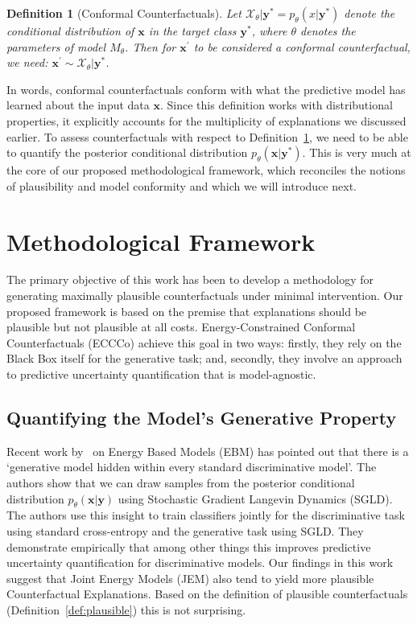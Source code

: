 \documentclass{article}
\newtheorem{definition}{Definition}[section]
\begin{document}
\begin{definition}[Conformal Counterfactuals]
  \label{def:conformal}
  Let $\mathcal{X}_{\theta}|\mathbf{y}^* = p_{\theta}(x|\mathbf{y}^*)$ denote the conditional distribution of $\mathbf{x}$ in the target class $\mathbf{y}^*$, where $\theta$ denotes the parameters of model $M_{\theta}$. Then for $\mathbf{x}^{\prime}$ to be considered a conformal counterfactual, we need: $\mathbf{x}^{\prime} \sim \mathcal{X}_{\theta}|\mathbf{y}^*$.
\end{definition}

In words, conformal counterfactuals conform with what the predictive model has learned about the input data $\mathbf{x}$. Since this definition works with distributional properties, it explicitly accounts for the multiplicity of explanations we discussed earlier. To assess counterfactuals with respect to Definition~\ref{def:conformal}, we need to be able to quantify the posterior conditional distribution $p_{\theta}(\mathbf{x}|\mathbf{y}^*)$. This is very much at the core of our proposed methodological framework, which reconciles the notions of plausibility and model conformity and which we will introduce next.

\section{Methodological Framework}\label{meth}

The primary objective of this work has been to develop a methodology for generating maximally plausible counterfactuals under minimal intervention. Our proposed framework is based on the premise that explanations should be plausible but not plausible at all costs. Energy-Constrained Conformal Counterfactuals (ECCCo) achieve this goal in two ways: firstly, they rely on the Black Box itself for the generative task; and, secondly, they involve an approach to predictive uncertainty quantification that is model-agnostic.

\subsection{Quantifying the Model's Generative Property}

Recent work by~\citet{grathwohl2020your} on Energy Based Models (EBM) has pointed out that there is a `generative model hidden within every standard discriminative model'. The authors show that we can draw samples from the posterior conditional distribution $p_{\theta}(\mathbf{x}|\mathbf{y})$ using Stochastic Gradient Langevin Dynamics (SGLD). The authors use this insight to train classifiers jointly for the discriminative task using standard cross-entropy and the generative task using SGLD. They demonstrate empirically that among other things this improves predictive uncertainty quantification for discriminative models. Our findings in this work suggest that Joint Energy Models (JEM) also tend to yield more plausible Counterfactual Explanations. Based on the definition of plausible counterfactuals (Definition~\ref{def:plausible}) this is not surprising. 
\end{document}
